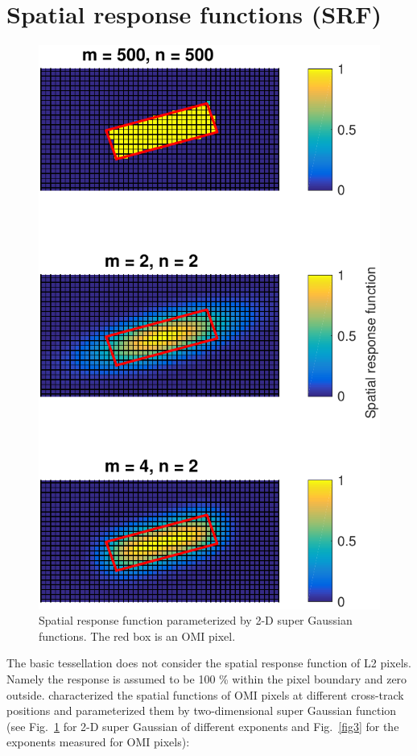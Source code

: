 \documentclass[hidelinks,12pt]{article}
\begin{document}
\section{Spatial response functions (SRF)}
\begin{figure}[hbtp]
 \centering
 \includegraphics[width=.5\linewidth]{../plot/spatial_response.pdf}
 \caption{Spatial response function parameterized by 2-D super Gaussian functions. The red box is an OMI pixel.}
 \label{fig2}
 \end{figure}

The basic tessellation does not consider the spatial response function of L2 pixels. Namely the response is assumed to be 100 \% within the pixel boundary and zero outside. \citet{graaf2016how} characterized the spatial functions of OMI pixels at different cross-track positions and parameterized them by two-dimensional super Gaussian function (see Fig.~\ref{fig2} for 2-D super Gaussian of different exponents and Fig.~\ref{fig3} for the exponents measured for OMI pixels):
\end{document}
